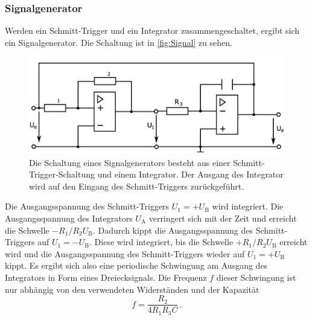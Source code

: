\subsubsection{Signalgenerator}
Werden ein Schmitt-Trigger und ein Integrator zusammengeschaltet, ergibt sich ein Signalgenerator. Die Schaltung ist in \autoref{fig:Signal} zu sehen.

\begin{figure}
    \centering
    \includegraphics[width=0.7\linewidth]{./figures/5_Signal.png}
    \caption{Die Schaltung eines Signalgenerators besteht aus einer Schmitt-Trigger-Schaltung und einem Integrator. Der Ausgang des Integrator wird auf den Eingang des Schmitt-Triggers zurückgeführt. \cite{V51}}
    \label{fig:Signal}
\end{figure}

Die Ausgangsspannung des Schmitt-Triggers $U_1 = + U_\text{B}$ wird integriert. Die Ausgangsspannung des Integrators $U_\text{A}$ verringert sich mit der Zeit und erreicht die Schwelle $- R_1/R_2 U_\text{B}$. Dadurch kippt die Ausgangsspannung des Schmitt-Triggers auf $U_1 = - U_\text{B}$. Diese wird integriert, bis die Schwelle $+ R_1/R_2 U_\text{B}$ erreicht wird und die Ausgangsspannung des Schmitt-Triggers wieder auf $U_1 = + U_\text{B}$ kippt. Es ergibt sich also eine periodische Schwingung am Ausgang des Integrators in Form eines Dreiecksignals. Die Frequenz $f$ dieser Schwingung ist nur abhängig von den verwendeten Widerständen und der Kapazität
\begin{equation}
    f = \frac{R_2}{4 R_1 R_3 C} \, .
    \label{eq:Frequenz}
\end{equation}










